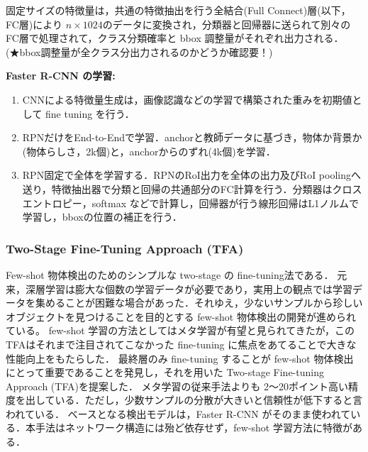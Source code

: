 \documentclass[originalpaper,fleqn]{jsaiart}     %
\begin{document}
固定サイズの特徴量は，共通の特徴抽出を行う全結合(Full Connect)層(以下，FC層)により $n{\times}1024$のデータに変換され，分類器と回帰器に送られて別々のFC層で処理されて，クラス分類確率と bbox 調整量がそれぞれ出力される．(★bbox調整量が全クラス分出力されるのかどうか確認要！)

{\bf Faster R-CNN の学習:\ } 
\begin{enumerate}
    \item CNNによる特徴量生成は，画像認識などの学習で構築された重みを初期値として fine tuning を行う．
    \item RPNだけをEnd-to-Endで学習．anchorと教師データに基づき，物体か背景か(物体らしさ，2k個)と，anchorからのずれ(4k個)を学習．
    \item RPN固定で全体を学習する．RPNのRoI出力を全体の出力及びRoI poolingへ送り，特徴抽出器で分類と回帰の共通部分のFC計算を行う．分類器はクロスエントロピー，softmax などで計算し，回帰器が行う線形回帰はL1ノルムで学習し，bboxの位置の補正を行う．
\end{enumerate}

\subsubsection{Two-Stage Fine-Tuning Approach (TFA)}
Few-shot 物体検出のためのシンプルな two-stage の fine-tuning法である\cite{WHGDY20}．
元来，深層学習は膨大な個数の学習データが必要であり，実用上の観点では学習データを集めることが困難な場合があった．それゆえ，少ないサンプルから珍しいオブジェクトを見つけることを目的とする few-shot 物体検出の開発が進められている。
few-shot 学習の方法としてはメタ学習が有望と見られてきたが，このTFAはそれまで注目されてこなかった fine-tuning に焦点をあてることで大きな性能向上をもたらした．
最終層のみ fine-tuning することが few-shot 物体検出にとって重要であることを発見し，それを用いた Two-stage Fine-tuning Approach (TFA)を提案した．
メタ学習の従来手法よりも 2〜20ポイント高い精度を出している．ただし，少数サンプルの分散が大きいと信頼性が低下すると言われている．
ベースとなる検出モデルは，Faster R-CNN がそのまま使われている．本手法はネットワーク構造には殆ど依存せず，few-shot 学習方法に特徴がある．
\end{document}
